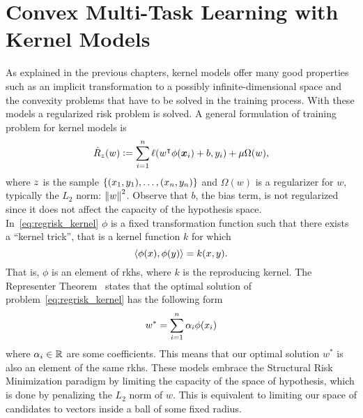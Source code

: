 \section{Convex Multi-Task Learning with Kernel Models}
As explained in the previous chapters, kernel models offer many good properties such as an implicit transformation to a possibly infinite-dimensional space and the convexity problems that have to be solved in the training process. With these models a regularized risk problem is solved.
A general formulation of training problem for kernel models is 
\begin{equation}
    \label{eq:regrisk_kernel}
    \emprisk({w}) \defeq \sum_{i=1}^{\nsamples} \lossf({w}^\intercal {\phi(\fv{x}_i)} + b, y_i) + \mu \Omega({w}) ,
\end{equation}
where $z$ is the sample $\{(x_1, y_1), \ldots, (x_n, y_n)\}$ and $\Omega(w)$ is a regularizer for ${w}$, typically the $L_2$ norm: $\left\lVert w\right\rVert^2$. Observe that $b$, the bias term, is not regularized since it does not affect the capacity of the hypothesis space.
In~\eqref{eq:regrisk_kernel} $\phi$ is a fixed transformation function such that there exists a ``kernel trick'', that is a kernel function $k$ for which
\begin{equation}
    \nonumber
    \left\langle \phi(x), \phi(y) \right\rangle = k(x, y).
\end{equation}
That is, $\phi$ is an element of \acrshort{rkhs}, where $k$ is the reproducing kernel. 
The Representer Theorem~\citep*{ScholkopfHS01} states that the optimal solution of problem~\eqref{eq:regrisk_kernel} has the following form
\begin{equation}
    \nonumber
    w^* = \sum_{i=1}^n \alpha_i \phi(x_i)
\end{equation}
where $\alpha_i \in \mathbb{R}$ are some coefficients. This means that our optimal solution $w^*$ is also an element of the same \acrshort{rkhs}.
These models embrace the Structural Risk Minimization paradigm by limiting the capacity of the space of hypothesis, which is done by penalizing the $L_2$ norm of $w$. This is equivalent to limiting our space of candidates to vectors inside a ball of some fixed radius.

